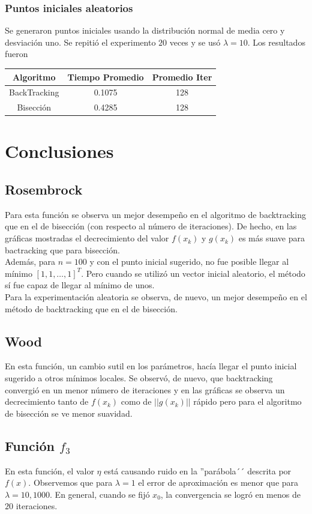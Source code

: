 \documentclass[11pt,letterpaper]{article}
\theoremstyle{definition}
\theoremstyle{definition}
\theoremstyle{definition}
\begin{document}
\subsubsection{Puntos iniciales aleatorios}
Se generaron puntos iniciales usando la distribución normal de media cero y desviación uno. Se repitió el experimento $ 20 $ veces y se usó $ \lambda = 10 $. Los resultados fueron
\begin{center}
	\begin{tabular}{ccc}
		\hline
		Algoritmo & Tiempo Promedio & Promedio Iter \\
		\hline
		BackTracking & 0.1075 & 128 \\
		Bisección    & 0.4285 & 128 \\
		\hline
	\end{tabular}
\end{center}
\section{Conclusiones}
	\subsection{Rosembrock}
	Para esta función se observa un mejor desempeño en el algoritmo de backtracking que en el de bisección (con respecto al número de iteraciones). De hecho, en las gráficas mostradas el decrecimiento del valor $ f(x_k) $ y $ g(x_k) $ es más suave para bactracking que para bisección.
	\\
	Además, para $ n = 100 $ y con el punto inicial sugerido, no fue posible llegar al mínimo $ [1, 1, \dots, 1]^T $. Pero cuando se utilizó un vector inicial aleatorio, el método sí fue capaz de llegar al mínimo de unos.
	\\
	Para la experimentación aleatoria se observa, de nuevo, un mejor desempeño en el método de backtracking que en el de bisección.
	
	\subsection{Wood}
	En esta función, un cambio sutil en los parámetros, hacía llegar el punto inicial sugerido a otros mínimos locales. Se observó, de nuevo, que backtracking convergió en un menor número de iteraciones y en las gráficas se observa un decrecimiento tanto de $ f(x_k) $ como de $ ||g(x_k) || $ rápido pero para el algoritmo de bisección se ve menor suavidad.
	
	\subsection{Función $ f_3 $}
	En esta función, el valor $ \eta $ está causando ruido en la ''parábola´´ descrita por $ f(x) $. Observemos que para $ \lambda = 1 $ el error de aproximación es menor que para $ \lambda = 10, 1000 $. En general, cuando se fijó $ x_0 $, la convergencia se logró en menos de $ 20 $ iteraciones. 
\end{document}
